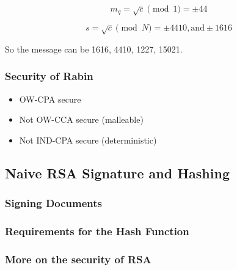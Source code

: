 \[ m_q = \sqrt{c} \pmod{1} = \pm 44\]

\[ s = \sqrt{c} \pmod{N} = \pm 4410 , \text{and} \pm 1616\]

So the message can be 1616, 4410, 1227, 15021.

\subsubsection{Security of Rabin}
\begin{itemize}
    \item OW-CPA secure
    \item Not OW-CCA secure (malleable)
    \item Not IND-CPA secure (deterministic)
\end{itemize}



\subsection{Naive RSA Signature and Hashing}

\subsubsection{Signing Documents}

\subsubsection{Requirements for the Hash Function}

\subsubsection{More on the security of RSA}